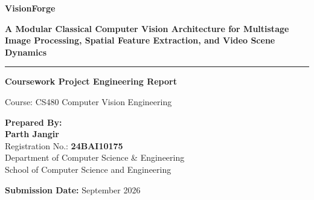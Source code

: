 \documentclass[11pt,a4paper]{article}
\begin{document}

\begin{titlepage}
    \centering

    \vspace*{1cm}

    {\Huge \bfseries VisionForge \par}

    \vspace{0.4cm}

    {\Large
    \textbf{
    A Modular Classical Computer Vision Architecture for
    Multistage Image Processing, Spatial Feature Extraction,
    and Video Scene Dynamics
    }
    \par}

    \vspace{0.6cm}

    \rule{\linewidth}{1.5pt}

    \vspace{1.5cm}

    {\Large \textbf{Coursework Project Engineering Report} \par}

    \vspace{0.3cm}

    {\large Course: CS480 Computer Vision Engineering \par}

    \vspace{3cm}

    \begin{minipage}{0.8\textwidth}
        \centering
        \large

        \textbf{Prepared By:}\\[0.2cm]

        \textbf{Parth Jangir}\\

        Registration No.: \textbf{24BAI10175}\\[0.3cm]

        Department of Computer Science \& Engineering\\

        School of Computer Science and Engineering
    \end{minipage}

    \vfill

    {\large \textbf{Submission Date:} September 2026 \par}

    \vspace{1cm}

\end{titlepage}
\end{document}
